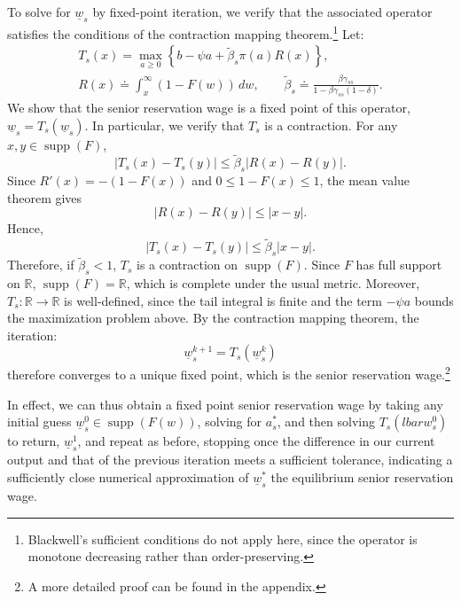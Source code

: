 \documentclass{article}
\newcommand{\lbar}[1]{\underline{#1}} %
\DeclareMathOperator\supp{supp} %
\begin{document}
To solve for $\lbar{w}_s$ by fixed-point iteration, we verify that the
associated operator satisfies the conditions of the contraction mapping theorem.\footnote{Blackwell's sufficient conditions do not apply here, since the operator is monotone decreasing rather than order-preserving.} Let:
\begin{align*}
T_s(x)
=
\max_{a\geq0}
\left\{
b-\psi a+
\tilde\beta_s\pi(a)R(x)
\right\},\\
R(x)\doteq\int_x^\infty (1-F(w))\,dw,
\qquad
\tilde\beta_s\doteq
\frac{\beta\gamma_{ss}}
{1-\beta\gamma_{ss}(1-\delta)}.
\end{align*}
We show that the senior reservation wage is a fixed point of this operator, $\lbar w_s=T_s(\lbar w_s)$.
In particular, we verify that $T_s$ is a contraction. For any $x,y\in\supp(F)$,
\[
|T_s(x)-T_s(y)|
\leq
\tilde\beta_s |R(x)-R(y)|.
\]
Since $R'(x)=-(1-F(x))$ and $0\leq 1-F(x)\leq1$, the mean value theorem gives
\[
|R(x)-R(y)|\leq |x-y|.
\]
Hence,
\[
|T_s(x)-T_s(y)|
\leq
\tilde\beta_s |x-y|.
\]
Therefore, if $\tilde\beta_s<1$, $T_s$ is a contraction on $\supp(F)$. Since
$F$ has full support on $\mathbb R$, $\supp(F)=\mathbb R$, which is complete
under the usual metric. Moreover, $T_s:\mathbb R\to\mathbb R$ is well-defined,
since the tail integral is finite and the term $-\psi a$ bounds the maximization problem above. By the contraction mapping theorem, the iteration:
\[
\lbar w_s^{k+1}=T_s(\lbar w_s^k)
\]
therefore converges to a unique fixed point, which is the senior reservation wage.\footnote{A more detailed proof can be found in the appendix.}

In effect, we can thus obtain a fixed point senior reservation wage by taking any initial guess $\lbar{w}_s^0\in\supp(F(w))$, solving for $a^*_s$, and then solving $T_s(lbar{w}_s^0)$ to return, $\lbar{w}_s^1$, and repeat as before, stopping once the difference in our current output and that of the previous iteration meets a sufficient tolerance, indicating a sufficiently close numerical approximation of $\lbar{w}_s^*$ the equilibrium senior reservation wage.
\end{document}
